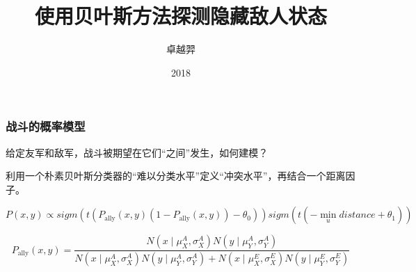 \documentclass{beamer}
\title[侦测隐藏敌人状态]{使用贝叶斯方法探测隐藏敌人状态 }
\author{卓越羿}
\institute[SICNU]{四川师范大学数学与软件科学学院}
\date{2018}
\begin{document}
\frame{\titlepage}

\begin{frame}

\frametitle{战斗的概率模型}

给定友军和敌军，战斗被期望在它们“之间”发生，如何建模？

利用一个朴素贝叶斯分类器的“难以分类水平”定义“冲突水平”，再结合一个距离因子。

$$
P(x,y) \propto sigm(t (P_\text{ally}(x,y) (1-P_\text{ally}(x,y)) - \theta_0)) sigm(t(-\min_{u} distance + \theta_1))
$$

$$
P_\text{ally}(x,y) = \frac{
N(x\mid \mu^A_X ,\sigma^A_X) N(y \mid \mu^A_Y, \sigma^A_Y)
}{
N(x \mid \mu^A_X , \sigma^A_X) N(y \mid \mu^A_Y , \sigma^A_Y) + 
N(x \mid \mu^E_X , \sigma^E_X) N(y \mid \mu^E_Y , \sigma^E_Y)
}
$$


\end{frame}
\end{document}
